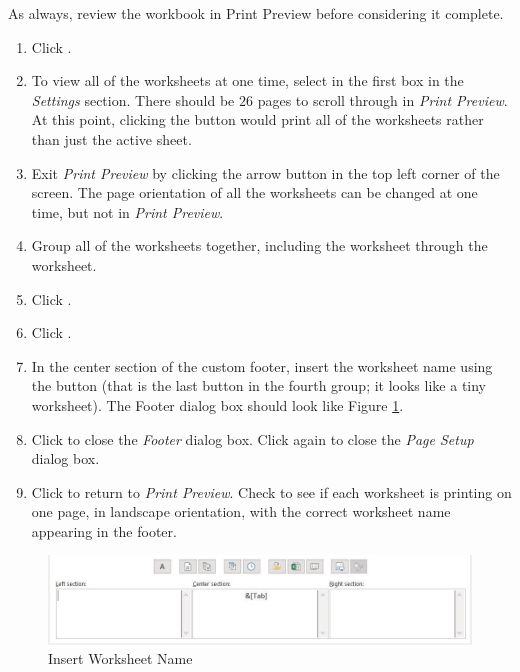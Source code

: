 As always, review the workbook in Print Preview before considering it complete.
\begin{enumerate}
	\item Click .
	\item To view all of the worksheets at one time, select  in the first box in the \textit{Settings} section. There should be $ 26 $ pages to scroll through in \textit{Print Preview}. At this point, clicking the  button would print all of the worksheets rather than just the active sheet.
	\item Exit \textit{Print Preview} by clicking the arrow button in the top left corner of the screen. The page orientation of all the worksheets can be changed at one time, but not in \textit{Print Preview}.
	\item Group all of the worksheets together, including the  worksheet through the  worksheet.
	\item Click .
	\item Click .
	\item In the center section of the custom footer, insert the worksheet name using the  button (that is the last button in the fourth group; it looks like a tiny worksheet). The Footer dialog box should look like Figure \ref{06:fig15}.
	\item Click  to close the \textit{Footer} dialog box. Click  again to close the \textit{Page Setup} dialog box.
	\item Click  to return to \textit{Print Preview}. Check to see if each worksheet is printing on one page, in landscape orientation, with the correct worksheet name appearing in the footer.
\end{enumerate}

\begin{figure}[H]
	\centering
	\includegraphics[width=\maxwidth{.95\linewidth}]{gfx/ch06_fig15}
	\caption{Insert Worksheet Name}
	\label{06:fig15}
\end{figure}


